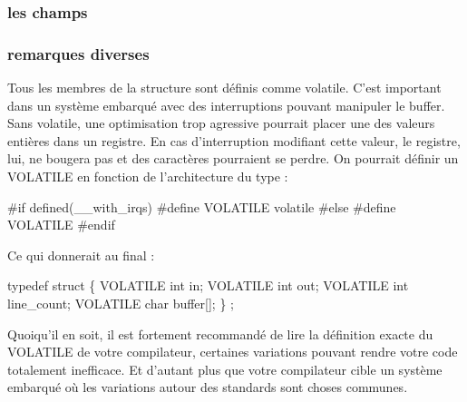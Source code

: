 \documentclass{scrartcl}%
\begin{document}
\nwendcode{}\nwdocspar
\subsubsection{les champs}
\subsubsection{remarques diverses}
Tous les membres de la structure sont définis comme {\Tt{}volatile\nwendquote}. C'est important dans un système embarqué avec des interruptions pouvant manipuler le buffer. Sans {\Tt{}volatile\nwendquote}, une optimisation trop agressive pourrait placer une des valeurs entières dans un registre. En cas d'interruption modifiant cette valeur, le registre, lui, ne bougera pas et des caractères pourraient se perdre.
On pourrait définir un {\Tt{}VOLATILE\nwendquote} en fonction de l'architecture du type :

\nwenddocs{}\endmoddef\nwstartdeflinemarkup{}\nwenddeflinemarkup

#if defined(__with_irqs)
  #define VOLATILE volatile
#else
  #define VOLATILE
#endif

\nwendcode{}\nwdocspar
Ce qui donnerait au final :

\nwenddocs{}\endmoddef\nwstartdeflinemarkup{}\nwenddeflinemarkup

typedef struct \{
    VOLATILE int in;
    VOLATILE int out;
    VOLATILE int line_count;
    VOLATILE char buffer[];
\} ;

\eatline
{}\nwendcode{}Quoiqu'il en soit, il est fortement recommandé de lire la définition exacte du {\Tt{}VOLATILE\nwendquote} de votre compilateur, certaines variations pouvant rendre votre code totalement inefficace. Et d'autant plus que votre compilateur cible un système embarqué où les variations autour des standards sont choses communes.
\end{document}
